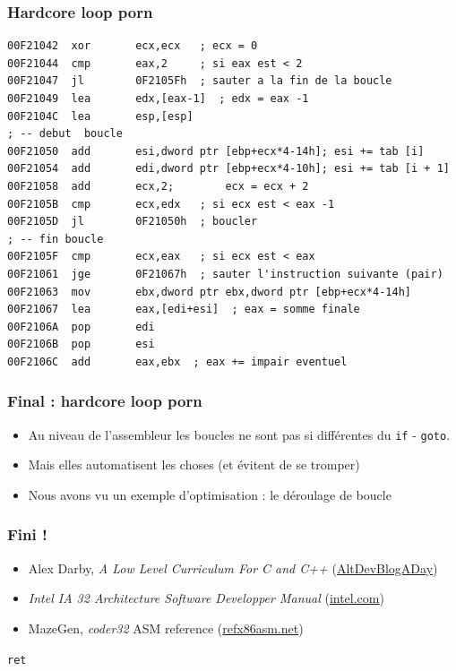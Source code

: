 \documentclass{beamer}
\begin{document}
\begin{frame}[fragile]
\frametitle{Hardcore loop porn}
\begin{lstlisting}[language={[x86masm]Assembler}, basicstyle={\scriptsize\ttfamily}]
00F21042  xor       ecx,ecx   ; ecx = 0 
00F21044  cmp       eax,2     ; si eax est < 2
00F21047  jl        0F2105Fh  ; sauter a la fin de la boucle 
00F21049  lea       edx,[eax-1]  ; edx = eax -1
00F2104C  lea       esp,[esp]  
; -- debut  boucle
00F21050  add       esi,dword ptr [ebp+ecx*4-14h]; esi += tab [i] 
00F21054  add       edi,dword ptr [ebp+ecx*4-10h]; esi += tab [i + 1]
00F21058  add       ecx,2;		  ecx = ecx + 2
00F2105B  cmp       ecx,edx   ; si ecx est < eax -1 
00F2105D  jl        0F21050h  ; boucler
; -- fin boucle
00F2105F  cmp       ecx,eax   ; si ecx est < eax 
00F21061  jge       0F21067h  ; sauter l'instruction suivante (pair)
00F21063  mov       ebx,dword ptr ebx,dword ptr [ebp+ecx*4-14h]   
00F21067  lea       eax,[edi+esi]  ; eax = somme finale
00F2106A  pop       edi  
00F2106B  pop       esi  
00F2106C  add       eax,ebx  ; eax += impair eventuel
\end{lstlisting}
\end{frame}

\begin{frame}[fragile]
\frametitle{Final : hardcore loop porn}
\begin{itemize}
\item Au niveau de l'assembleur les boucles ne sont pas si différentes du  \lstinline+if+ - \lstinline+goto+.
\item Mais elles automatisent les choses (et évitent de se tromper)
\item Nous avons vu un exemple d'optimisation : le déroulage de boucle
\end{itemize}
\end{frame}

\begin{frame}[fragile]
\frametitle{Fini !}

\begin{itemize}
\item Alex Darby, \textit{A Low Level Curriculum For C and C++} (\href{http://http://www.altdevblogaday.com/2011/11/09/a-low-level-curriculum-for-c-and-c/}{AltDevBlogADay})
\item \textit{Intel IA 32 Architecture Software Developper Manual} (\href{http://download.intel.com/products/processor/manual/325462.pdf}{intel.com})
\item MazeGen, \textit{coder32} ASM reference (\href{http://ref.x86asm.net}{refx86asm.net})
\end{itemize}

\begin{center}
\begin{large}
\lstinline[language={[x86masm]Assembler}]+ret+ 
\end{large}
\end{center}
\end{frame}
\end{document}
